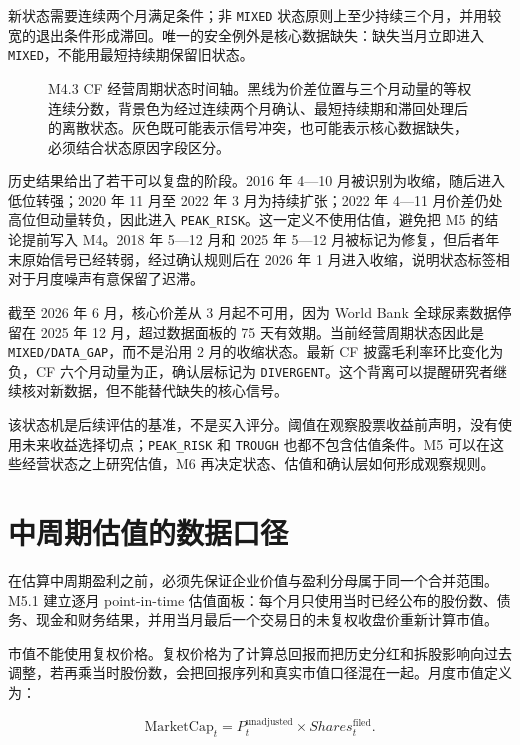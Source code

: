 \documentclass[11pt,a4paper]{ctexart}
\begin{document}
新状态需要连续两个月满足条件；非 \texttt{MIXED} 状态原则上至少持续三个月，并用较宽的退出条件形成滞回。唯一的安全例外是核心数据缺失：缺失当月立即进入 \texttt{MIXED}，不能用最短持续期保留旧状态。

\begin{figure}[htbp]
\centering

\caption{M4.3 CF 经营周期状态时间轴。黑线为价差位置与三个月动量的等权连续分数，背景色为经过连续两个月确认、最短持续期和滞回处理后的离散状态。灰色既可能表示信号冲突，也可能表示核心数据缺失，必须结合状态原因字段区分。}
\label{fig:cf-cycle-state-timeline}
\end{figure}

历史结果给出了若干可以复盘的阶段。2016 年 4---10 月被识别为收缩，随后进入低位转强；2020 年 11 月至 2022 年 3 月为持续扩张；2022 年 4---11 月价差仍处高位但动量转负，因此进入 \texttt{PEAK\_RISK}。这一定义不使用估值，避免把 M5 的结论提前写入 M4。2018 年 5---12 月和 2025 年 5---12 月被标记为修复，但后者年末原始信号已经转弱，经过确认规则后在 2026 年 1 月进入收缩，说明状态标签相对于月度噪声有意保留了迟滞。

截至 2026 年 6 月，核心价差从 3 月起不可用，因为 World Bank 全球尿素数据停留在 2025 年 12 月，超过数据面板的 75 天有效期。当前经营周期状态因此是 \texttt{MIXED/DATA\_GAP}，而不是沿用 2 月的收缩状态。最新 CF 披露毛利率环比变化为负，CF 六个月动量为正，确认层标记为 \texttt{DIVERGENT}。这个背离可以提醒研究者继续核对新数据，但不能替代缺失的核心信号。

该状态机是后续评估的基准，不是买入评分。阈值在观察股票收益前声明，没有使用未来收益选择切点；\texttt{PEAK\_RISK} 和 \texttt{TROUGH} 也都不包含估值条件。M5 可以在这些经营状态之上研究估值，M6 再决定状态、估值和确认层如何形成观察规则。

\section{中周期估值的数据口径}

在估算中周期盈利之前，必须先保证企业价值与盈利分母属于同一个合并范围。M5.1 建立逐月 point-in-time 估值面板：每个月只使用当时已经公布的股份数、债务、现金和财务结果，并用当月最后一个交易日的未复权收盘价重新计算市值。

市值不能使用复权价格。复权价格为了计算总回报而把历史分红和拆股影响向过去调整，若再乘当时股份数，会把回报序列和真实市值口径混在一起。月度市值定义为：

\begin{equation*}
\text{MarketCap}_t=P^{\text{unadjusted}}_t\times Shares^{\text{filed}}_t.
\end{equation*}
\end{document}
